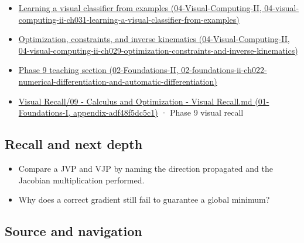 \begin{itemize}
\tightlist
\item
  \href{../04-Visual-Computing-II/main.pdf\#nameddest=04-visual-computing-ii-ch031-learning-a-visual-classifier-from-examples}{Learning a visual classifier from examples (04-Visual-Computing-II, 04-visual-computing-ii-ch031-learning-a-visual-classifier-from-examples)}
\item
  \href{../04-Visual-Computing-II/main.pdf\#nameddest=04-visual-computing-ii-ch029-optimization-constraints-and-inverse-kinematics}{Optimization, constraints, and inverse kinematics (04-Visual-Computing-II, 04-visual-computing-ii-ch029-optimization-constraints-and-inverse-kinematics)}
\item
  \href{../02-Foundations-II/main.pdf\#nameddest=02-foundations-ii-ch022-numerical-differentiation-and-automatic-differentiation}{Phase 9 teaching section (02-Foundations-II, 02-foundations-ii-ch022-numerical-differentiation-and-automatic-differentiation)}
\item
  \href{../01-Foundations-I/main.pdf\#nameddest=appendix-adf48f5dc5c1}{Visual Recall/09 - Calculus and Optimization - Visual Recall.md (01-Foundations-I, appendix-adf48f5dc5c1)} · Phase 9 visual recall
\end{itemize}

\subsection{Recall and next depth}\label{appendix-40df0855b4a7-recall-and-next-depth}

\begin{itemize}
\tightlist
\item
  Compare a JVP and VJP by naming the direction propagated and the Jacobian multiplication performed.
\item
  Why does a correct gradient still fail to guarantee a global minimum?
\end{itemize}

\subsection{Source and navigation}\label{appendix-40df0855b4a7-source-and-navigation}

